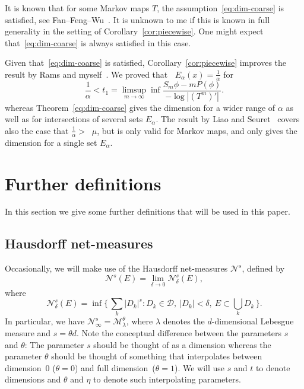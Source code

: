 \documentclass[AHL,Unicode,longabstracts]{cedram}
\DeclareMathOperator{\dimh}{dim_H}
\newcommand*{\dimh}{\mathrm{dim}_{\mathrm{H}}}
\begin{document}
\begin{rema}
It is known that for some Markov maps $T$, the assumption~\eqref{eq:dim-coarse} is satisfied, see Fan--Feng--Wu~\cite{fanfengwu}. It is unknown to me if this is known in full generality in the setting of Corollary~\ref{cor:piecewise}. One might expect that~\eqref{eq:dim-coarse} is always satisfied in this case.

Given that~\eqref{eq:dim-coarse} is satisfied, Corollary~\ref{cor:piecewise} improves the result by Rams and myself~\cite[Theorem~2]{perssonrams}. We proved that $\dimh E_\alpha (x) =
\frac{1}{\alpha}$ for
\[
\frac{1}{\alpha} < t_1 = \limsup_{m\to \infty} \inf \frac{S_m \phi - m P(\phi)}{- \log |(T^m)'|}.
\]
whereas Theorem~\ref{eq:dim-coarse} gives the dimension for a wider range of $\alpha$ as well as for intersections of several sets $E_\alpha$. The result by Liao and Seuret~\cite{liaoseuret} covers also the case that $\frac{1}{\alpha} > \dimh \mu$, but is only valid for Markov maps, and only gives the dimension for a single set $E_\alpha$.
\end{rema}



\section{Further definitions} \label{sec:furtherdefinitions}

In this section we give some further definitions that will be used in this paper.

\subsection{Hausdorff net-measures}

Occasionally, we will make use of the Hausdorff net-measures $\mathscr{N}^s$, defined by
\[
\mathscr{N}^s (E) = \lim_{\delta \to 0} \mathscr{N}_\delta^s (E),
\]
where
\[
\mathscr{N}_\delta^s (E) = \inf \biggl\{\, \sum_k |D_k|^s : D_k
\in \mathscr{D}, \ |D_k| < \delta,\ E \subset \bigcup_k D_k
\,\biggr\}.
\]
In particular, we have $\mathscr{N}_\infty^s =
\mathscr{M}_\lambda^{\theta}$, where $\lambda$ denotes the $d$-dimensional Lebesgue measure and $s = \theta d$. Note the conceptual difference between the parameters $s$ and $\theta$: The parameter $s$ should be thought of as a dimension whereas the parameter $\theta$ should be thought of something that interpolates between dimension~0 ($\theta = 0$) and full dimension~($\theta = 1$). We will use $s$ and $t$ to denote dimensions and $\theta$ and $\eta$ to denote such interpolating parameters.
\end{document}
